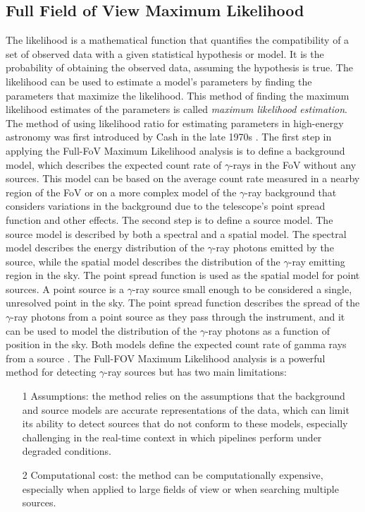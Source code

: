 \subsection{Full Field of View Maximum Likelihood}
\label{ss:ffov-ml}
The likelihood is a mathematical function that quantifies the compatibility of a set of observed data with a given statistical hypothesis or model. It is the probability of obtaining the observed data, assuming the hypothesis is true. The likelihood can be used to estimate a model's parameters by finding the parameters that maximize the likelihood. This method of finding the maximum likelihood estimates of the parameters is called \textit{maximum likelihood estimation}. The method of using likelihood ratio for estimating parameters in high-energy astronomy was first introduced by Cash in the late 1970s \cite{cash_1979}. The first step in applying the Full-FoV Maximum Likelihood analysis is to define a background model, which describes the expected count rate of $\gamma$-rays in the FoV without any sources. This model can be based on the average count rate measured in a nearby region of the FoV or on a more complex model of the $\gamma$-ray background that considers variations in the background due to the telescope's point spread function and other effects. The second step is to define a source model. The source model is described 
by both a spectral and a spatial model. The spectral model describes the energy distribution of the $\gamma$-ray photons emitted by the source, while the spatial model describes the distribution of the $\gamma$-ray emitting region in the sky. The point spread function is used as the spatial model for point sources. A point source is a $\gamma$-ray source small enough to be considered a single, unresolved point in the sky. The point spread function describes the spread of the $\gamma$-ray photons from a point source as they pass through the instrument, and it can be used to model the distribution of the $\gamma$-ray photons as a function of position in the sky. Both models define the expected count rate of gamma rays from a source \cite{di2020detection}.  The Full-FOV Maximum Likelihood analysis is a powerful method for detecting $\gamma$-ray sources but has two main limitations:
\begin{itemize}
    \item[1] Assumptions: the method relies on the assumptions that the background and source models are accurate representations of the data, which can limit its ability to detect sources that do not conform to these models, especially challenging in the real-time context in which pipelines perform under degraded conditions.
    \item[2] Computational cost: the method can be computationally expensive, especially when applied to large fields of view or when searching multiple sources.
\end{itemize}

